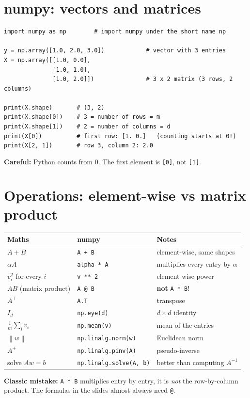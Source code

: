 \documentclass[11pt,a4paper]{article}
\newcommand{\norm}[1]{\left\lVert #1 \right\rVert}
\begin{document}
\section{numpy: vectors and matrices}
\begin{lstlisting}
import numpy as np        # import numpy under the short name np

y = np.array([1.0, 2.0, 3.0])            # vector with 3 entries
X = np.array([[1.0, 0.0],
              [1.0, 1.0],
              [1.0, 2.0]])               # 3 x 2 matrix (3 rows, 2 columns)

print(X.shape)       # (3, 2)
print(X.shape[0])    # 3 = number of rows = m
print(X.shape[1])    # 2 = number of columns = d
print(X[0])          # first row: [1. 0.]   (counting starts at 0!)
print(X[2, 1])       # row 3, column 2: 2.0
\end{lstlisting}
\textbf{Careful:} Python counts from $0$. The first element is \texttt{[0]}, not \texttt{[1]}.

\section{Operations: element-wise vs matrix product}
\begin{center}
\begin{tabular}{@{}lll@{}}
\toprule
Maths & numpy & Notes \\
\midrule
$A + B$ & \texttt{A + B} & element-wise, same shapes \\
$\alpha A$ & \texttt{alpha * A} & multiplies every entry by $\alpha$ \\
$v_i^2$ for every $i$ & \texttt{v ** 2} & element-wise power \\
$AB$ (matrix product) & \texttt{A @ B} & \textbf{not} \texttt{A * B}! \\
$A^\top$ & \texttt{A.T} & transpose \\
$I_d$ & \texttt{np.eye(d)} & $d\times d$ identity \\
$\frac{1}{m}\sum_i v_i$ & \texttt{np.mean(v)} & mean of the entries \\
$\norm{w}$ & \texttt{np.linalg.norm(w)} & Euclidean norm \\
$A^{+}$ & \texttt{np.linalg.pinv(A)} & pseudo-inverse \\
solve $Aw = b$ & \texttt{np.linalg.solve(A, b)} & better than computing $A^{-1}$ \\
\bottomrule
\end{tabular}
\end{center}
\textbf{Classic mistake:} \texttt{A * B} multiplies entry by entry, it is \emph{not} the row-by-column product.
The formulas in the slides almost always need \texttt{@}.
\end{document}
